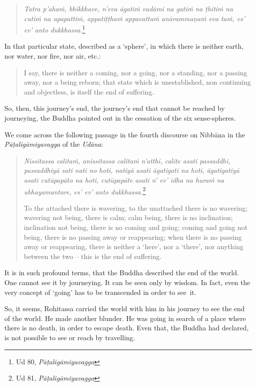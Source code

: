\begin{quote}
\emph{Tatra p'ahaṁ, bhikkhave, n'eva āgatiṁ vadāmi na gatiṁ na ṭhitiṁ na cutiṁ na upapattiṁ, appatiṭṭhaṁ appavattaṁ anārammaṇaṁ eva taṁ, es' ev' anto dukkhassa.}\footnote{Ud 80, \emph{Pāṭaligāmiyavagga}}
\end{quote}

In that particular state, described as a `sphere', in which there is neither earth, nor water, nor fire, nor air, etc.:

\begin{quote}
I say, there is neither a coming, nor a going, nor a standing, nor a passing away, nor a being reborn; that state which is unestablished, non continuing and objectless, is itself the end of suffering.
\end{quote}

So, then, this journey's end, the journey's end that cannot be reached by journeying, the Buddha pointed out in the cessation of the six sense-spheres.

We come across the following passage in the fourth discourse on Nibbāna in the \emph{Pāṭaligāmiyavagga} of the \emph{Udāna}:

\begin{quote}
\emph{Nissitassa calitaṁ, anissitassa calitaṁ n'atthi, calite asati passaddhi, passaddhiyā sati nati no hoti, natiyā asati āgatigati na hoti, āgatigatiyā asati cutūpapāto na hoti, cutūpapāte asati n' ev' idha na huraṁ na ubhayamantare, es' ev' anto dukkhassa.}\footnote{Ud 81, \emph{Pāṭaligāmiyavagga}}

To the attached there is wavering, to the unattached there is no wavering; wavering not being, there is calm; calm being, there is no inclination; inclination not being, there is no coming and going; coming and going not being, there is no passing away or reappearing; when there is no passing away or reappearing, there is neither a `here', nor a `there', nor anything between the two -- this is the end of suffering.
\end{quote}

It is in such profound terms, that the Buddha described the end of the world. One cannot see it by journeying. It can be seen only by wisdom. In fact, even the very concept of `going' has to be transcended in order to see~it.

So, it seems, Rohitassa carried the world with him in his journey to see the end of the world. He made another blunder. He was going in search of a place where there is no death, in order to escape death. Even that, the Buddha had declared, is not possible to see or reach by travelling.

